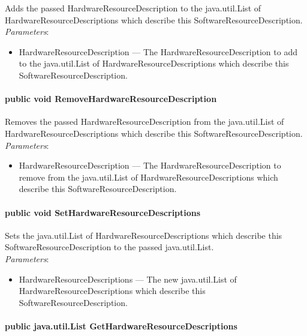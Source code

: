 \documentclass[$Date: 2003/06/26 19:29:31 $]{glabarticle}
\begin{document}
Adds the passed HardwareResourceDescription to the java.util.List of
HardwareResourceDescriptions which describe this
SoftwareResourceDescription. \\

\textit{Parameters}:
\begin{itemize}
\item[] HardwareResourceDescription --- The HardwareResourceDescription to add to the java.util.List of 
HardwareResourceDescriptions which describe this SoftwareResourceDescription.
\end{itemize}
 
\paragraph{public void RemoveHardwareResourceDescription}

Removes the passed HardwareResourceDescription from the java.util.List of
HardwareResourceDescriptions which describe this
SoftwareResourceDescription. \\

\textit{Parameters}:
\begin{itemize}
\item[] HardwareResourceDescription --- The HardwareResourceDescription to remove from the java.util.List of HardwareResourceDescriptions which describe this SoftwareResourceDescription.
\end{itemize}

\paragraph{public void SetHardwareResourceDescriptions}

Sets the java.util.List of HardwareResourceDescriptions which describe this
SoftwareResourceDescription to the passed java.util.List. \\

\textit{Parameters}:
\begin{itemize}
\item[] HardwareResourceDescriptions --- The new java.util.List of HardwareResourceDescriptions which describe 
this SoftwareResourceDescription.
\end{itemize}

\paragraph{public java.util.List GetHardwareResourceDescriptions}
\end{document}
